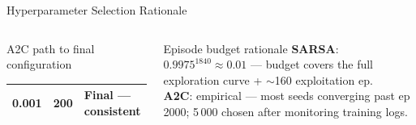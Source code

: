 \documentclass[aspectratio=169, 10pt]{beamer}
\begin{document}
\begin{frame}{Hyperparameter Selection Rationale}
\begin{columns}[T]
\begin{block}{A2C path to final configuration}
\begin{tabular}{ccl}
          \textbf{0.001} & \textbf{200} & \textbf{Final --- consistent}\\
          \bottomrule
        \end{tabular}
      \end{block}
      \vspace{0.4em}
      \begin{block}{Episode budget rationale}
        \textbf{SARSA}: $0.9975^{1840}\!\approx\!0.01$ --- budget
        covers the full exploration curve + $\sim$160 exploitation ep.\\
        \textbf{A2C}: empirical --- most seeds converging past ep\,2000;
        5\,000 chosen after monitoring training logs.
      \end{block}
  \end{columns}
\end{frame}
\end{document}
